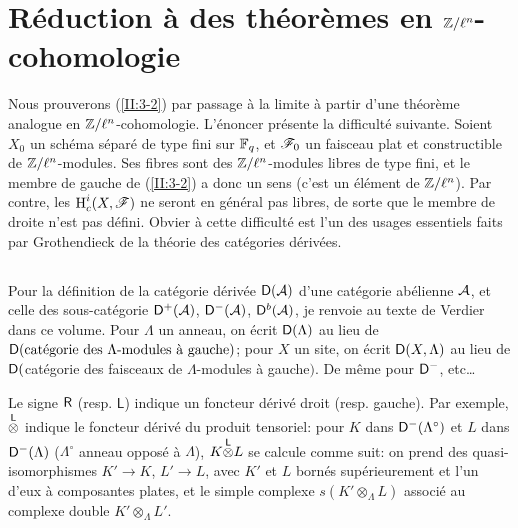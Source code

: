 \section{Réduction à des théorèmes en \texorpdfstring{$\mathbb{Z}/\ell^n$}{Z/l n}-cohomologie}\label{II:4}

Nous prouverons (\ref{II:3-2}) par passage à la limite à partir d'une 
théorème analogue en $\mathbb{Z}/\ell^n$-cohomologie. L'énoncer présente la 
difficulté suivante. Soient $X_0$ un schéma séparé de type fini sur 
$\mathbb{F}_q$, et $\mathscr{F}_0$ un faisceau plat et constructible de $\mathbb{Z}/\ell^n$-modules. 
Ses fibres sont des $\mathbb{Z}/\ell^n$-modules libres de type fini, et le membre de 
gauche de (\ref{II:3-2}) a donc un sens (c'est un élément de $\mathbb{Z}/\ell^n$). 
Par contre, les $\operatorname{H}_c^i(X,\mathscr{F})$ ne seront en général pas libres, de sorte 
que le membre de droite n'est pas défini. Obvier à cette difficulté est 
l'un des usages essentiels faits par Grothendieck de la théorie des 
catégories dérivées.





\subsection{}\label{II:4-1}

Pour la définition de la catégorie dérivée $\mathsf{D}(\mathcal{A})$ d'une catégorie 
abélienne $\mathcal{A}$, et celle des sous-catégorie $\mathsf{D}^+(\mathcal{A})$, $\mathsf{D}^-(\mathcal{A})$, 
$\mathsf{D}^b(\mathcal{A})$, je renvoie au texte de Verdier dans ce volume. Pour $\Lambda$ 
un anneau, on écrit $\mathsf{D}(\Lambda)$ au lieu de 
$\mathsf{D}(\text{catégorie des $\Lambda$-modules à gauche})$; pour $X$ un site, on 
écrit $\mathsf{D}(X,\Lambda)$ au lieu de 
$\mathsf{D}($catégorie des faisceaux de $\Lambda$-modules à gauche$)$. De 
même pour $\mathsf{D}^-$, etc\ldots

Le signe $\mathsf{R}$ (resp. $\mathsf{L}$) indique un foncteur dérivé droit (resp. 
gauche). Par exemple, ${\overset{\mathsf{L}}{\otimes}}$ indique le foncteur dérivé du produit 
tensoriel: pour $K$ dans $\mathsf{D}^-(\Lambda^\circ)$ et $L$ dans $\mathsf{D}^-(\Lambda)$ 
($\Lambda^\circ$ anneau opposé à $\Lambda$), $K{\overset{\mathsf{L}}{\otimes}} L$ se calcule 
comme suit: on prend des quasi-isomorphismes $K'\to K$, $L'\to L$, avec 
$K'$ et $L$ bornés supérieurement et l'un d'eux à composantes plates, et 
le simple complexe $s(K'\otimes_\Lambda L)$ associé au complexe double 
$K'\otimes_\Lambda L'$. 





\subsection{}\label{II:4-2}

